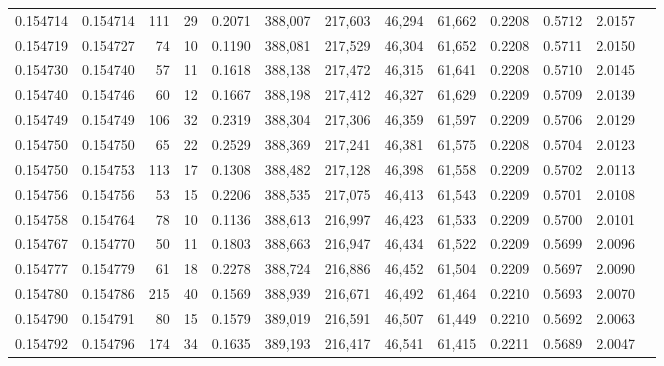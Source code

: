 \begin{tabular}{rrrrrrrrrrrrr}
0.154714 & 0.154714 &   111 &  29 &                                     0.2071 & 388,007 & 217,603 &  46,294 &  61,662 & 0.2208 & 0.5712 & 2.0157 \\
0.154719 & 0.154727 &    74 &  10 &                                     0.1190 & 388,081 & 217,529 &  46,304 &  61,652 & 0.2208 & 0.5711 & 2.0150 \\
0.154730 & 0.154740 &    57 &  11 &                                     0.1618 & 388,138 & 217,472 &  46,315 &  61,641 & 0.2208 & 0.5710 & 2.0145 \\
0.154740 & 0.154746 &    60 &  12 &                                     0.1667 & 388,198 & 217,412 &  46,327 &  61,629 & 0.2209 & 0.5709 & 2.0139 \\
0.154749 & 0.154749 &   106 &  32 &                                     0.2319 & 388,304 & 217,306 &  46,359 &  61,597 & 0.2209 & 0.5706 & 2.0129 \\
0.154750 & 0.154750 &    65 &  22 &                                     0.2529 & 388,369 & 217,241 &  46,381 &  61,575 & 0.2208 & 0.5704 & 2.0123 \\
0.154750 & 0.154753 &   113 &  17 &                                     0.1308 & 388,482 & 217,128 &  46,398 &  61,558 & 0.2209 & 0.5702 & 2.0113 \\
0.154756 & 0.154756 &    53 &  15 &                                     0.2206 & 388,535 & 217,075 &  46,413 &  61,543 & 0.2209 & 0.5701 & 2.0108 \\
0.154758 & 0.154764 &    78 &  10 &                                     0.1136 & 388,613 & 216,997 &  46,423 &  61,533 & 0.2209 & 0.5700 & 2.0101 \\
0.154767 & 0.154770 &    50 &  11 &                                     0.1803 & 388,663 & 216,947 &  46,434 &  61,522 & 0.2209 & 0.5699 & 2.0096 \\
0.154777 & 0.154779 &    61 &  18 &                                     0.2278 & 388,724 & 216,886 &  46,452 &  61,504 & 0.2209 & 0.5697 & 2.0090 \\
0.154780 & 0.154786 &   215 &  40 &                                     0.1569 & 388,939 & 216,671 &  46,492 &  61,464 & 0.2210 & 0.5693 & 2.0070 \\
0.154790 & 0.154791 &    80 &  15 &                                     0.1579 & 389,019 & 216,591 &  46,507 &  61,449 & 0.2210 & 0.5692 & 2.0063 \\
0.154792 & 0.154796 &   174 &  34 &                                     0.1635 & 389,193 & 216,417 &  46,541 &  61,415 & 0.2211 & 0.5689 & 2.0047 \\

\end{tabular}
